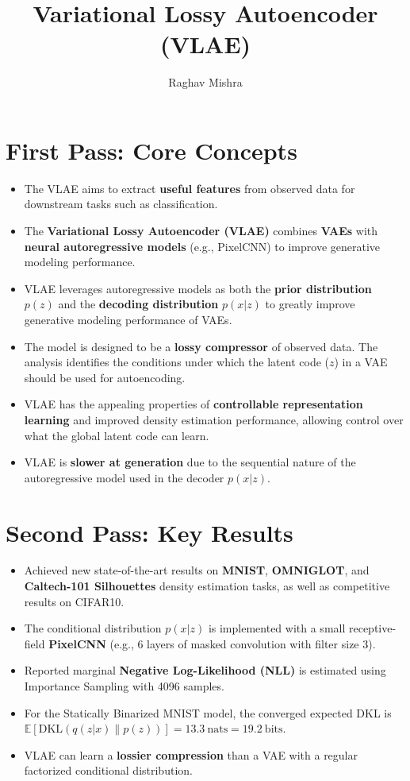 \documentclass[12pt]{article}
\date{} %
\title{Variational Lossy Autoencoder (VLAE)}
\author{Raghav Mishra}
\begin{document}
\maketitle

\section{First Pass: Core Concepts}

\begin{itemize}
    \item The VLAE aims to extract \textbf{useful features} from observed data for downstream tasks such as classification.
    \item The \textbf{Variational Lossy Autoencoder (VLAE)} combines \textbf{VAEs} with \textbf{neural autoregressive models} (e.g., PixelCNN) to improve generative modeling performance.
    \item VLAE leverages autoregressive models as both the \textbf{prior distribution} $p(z)$ and the \textbf{decoding distribution} $p(x|z)$ to greatly improve generative modeling performance of VAEs.
    \item The model is designed to be a \textbf{lossy compressor} of observed data. The analysis identifies the conditions under which the latent code ($z$) in a VAE should be used for autoencoding.
    \item VLAE has the appealing properties of \textbf{controllable representation learning} and improved density estimation performance, allowing control over what the global latent code can learn.
    \item VLAE is \textbf{slower at generation} due to the sequential nature of the autoregressive model used in the decoder $p(x|z)$.
\end{itemize}

\section{Second Pass: Key Results}

\begin{itemize}
    \item Achieved new state-of-the-art results on \textbf{MNIST}, \textbf{OMNIGLOT}, and \textbf{Caltech-101 Silhouettes} density estimation tasks, as well as competitive results on CIFAR10.
    \item The conditional distribution $p(x|z)$ is implemented with a small receptive-field \textbf{PixelCNN} (e.g., 6 layers of masked convolution with filter size 3).
    \item Reported marginal \textbf{Negative Log-Likelihood (NLL)} is estimated using Importance Sampling with 4096 samples.
    \item For the Statically Binarized MNIST model, the converged expected DKL is $\mathbb{E}[\mathrm{DKL}(q(z|x)\|p(z))] = 13.3~\text{nats} = 19.2~\text{bits}$.
    \item VLAE can learn a \textbf{lossier compression} than a VAE with a regular factorized conditional distribution.
\end{itemize}
\end{document}
